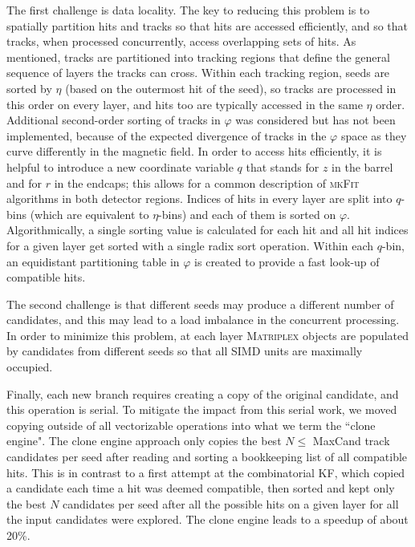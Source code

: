 \documentclass[a4paper,11pt]{article}
\newcommand{\Matriplex}{\textsc{Matriplex}\xspace}
\newcommand{\mkFit}{\textsc{mkFit}\xspace}
\begin{document}
The first challenge is data locality. The key to reducing this problem is to spatially partition hits and tracks so that hits are accessed efficiently, and so that tracks, when processed concurrently, access overlapping sets of hits. As mentioned, tracks are partitioned into tracking regions that define the general sequence of layers the tracks can cross. Within each tracking region, seeds are sorted by $\eta$ (based on the outermost hit of the seed), so tracks are processed in this order on every layer, and hits too are typically accessed in the same $\eta$ order. Additional second-order sorting of tracks in $\varphi$ was considered but has not been implemented, because of the expected divergence of tracks in the $\varphi$ space as they curve differently in the magnetic field. 
In order to access hits efficiently, it is helpful to introduce a new coordinate variable $q$ that stands for $z$ in the barrel and for $r$ in the endcaps; this allows for a common description of \mkFit algorithms in both detector regions. Indices of hits in every layer are split into $q$-bins (which are equivalent to $\eta$-bins) and each of them is sorted on $\varphi$. Algorithmically, a single sorting value is calculated for each hit and all hit indices for a given layer get sorted with a single radix sort operation. Within each $q$-bin, an equidistant partitioning table in $\varphi$ is created to provide a fast look-up of compatible hits.

The second challenge is that different seeds may produce a different number of candidates, and this may lead to a load imbalance in the concurrent processing. In order to minimize this problem, at each layer \Matriplex objects are populated by candidates from different seeds so that all SIMD units are maximally occupied.

Finally, each new branch requires creating a copy of the original candidate, and this operation is serial. To mitigate the impact from this serial work, we moved copying outside of all vectorizable operations into what we term the ``clone engine". The clone engine approach only copies the best $N\leq$ MaxCand track candidates per seed after reading and sorting a bookkeeping list of all compatible hits. This is in contrast to a first attempt at the combinatorial KF, which copied a candidate each time a hit was deemed compatible, then sorted and kept only the best $N$ candidates per seed after all the possible hits on a given layer for all the input candidates were explored. The clone engine leads to a speedup of about 20\%.
\end{document}
